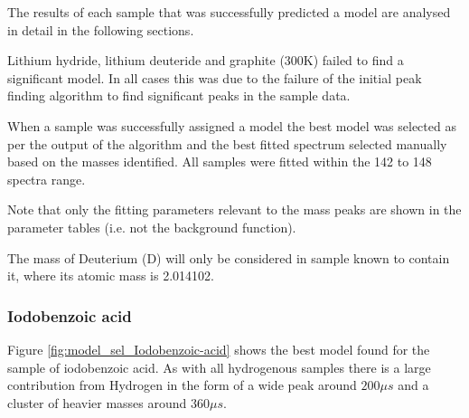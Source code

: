 \documentclass[a4paper]{article}
\newcommand{\chem}[1]{$\mathrm{#1}$}
\begin{document}
The results of each sample that was successfully predicted a model are analysed
in detail in the following sections.

Lithium hydride, lithium deuteride and graphite (300K) failed to find a
significant model. In all cases this was due to the failure of the initial peak
finding algorithm to find significant peaks in the sample data.

When a sample was successfully assigned a model the best model was selected as
per the output of the algorithm and the best fitted spectrum selected manually
based on the masses identified. All samples were fitted within the 142 to 148
spectra range.

Note that only the fitting parameters relevant to the mass peaks are shown in
the parameter tables (i.e. not the background function).

The mass of Deuterium (\chem{D}) will only be considered in sample known to
contain it, where its atomic mass is 2.014102.

\subsubsection{Iodobenzoic acid}

Figure \ref{fig:model_sel_Iodobenzoic-acid} shows the best model found for the
sample of iodobenzoic acid. As with all hydrogenous samples there is a large
contribution from Hydrogen in the form of a wide peak around $200 \mu s$ and a
cluster of heavier masses around $360 \mu s$.
\end{document}
